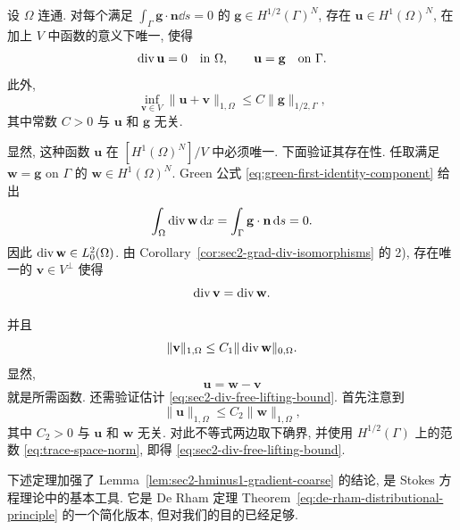 \setcounter{statement}{1}
\begin{Lemma}\label{lem:sec2-div-free-lifting}
设 $\Omega$ 连通. 对每个满足 $\int_\Gamma\mathbf g\cdot\mathbf n\dd s=0$ 的
$\mathbf g\in H^{1/2}(\Gamma)^N$, 存在 $\mathbf u\in H^1(\Omega)^N$, 在加上
$V$ 中函数的意义下唯一, 使得
\[
  \operatorname{div}\mathbf u=0\quad\text{in }\Omega,
  \qquad \mathbf u=\mathbf g\quad\text{on }\Gamma.
\]
此外,
\begin{equation}\label{eq:sec2-div-free-lifting-bound}
  \inf_{\mathbf v\in V}\|\mathbf u+\mathbf v\|_{1,\Omega}
  \le C\|\mathbf g\|_{1/2,\Gamma},
\end{equation}
其中常数 $C>0$ 与 $\mathbf u$ 和 $\mathbf g$ 无关.
\end{Lemma}
\begin{Proof}
显然, 这种函数 $\mathbf u$ 在 $[H^1(\Omega)^N]/V$ 中必须唯一. 下面验证其存在性.
任取满足 $\mathbf w=\mathbf g$ on $\Gamma$ 的 $\mathbf w\in H^1(\Omega)^N$.
Green 公式 \eqref{eq:green-first-identity-component} 给出
\[
  \int_\Omega\operatorname{div}\mathbf w\,\mathrm{d} x
  =\int_\Gamma\mathbf g\cdot\mathbf n\,\mathrm{d} s=0.
\]
因此 $\operatorname{div}\mathbf w\in L_0^2(\Omega)$. 由 Corollary~\ref{cor:sec2-grad-div-isomorphisms} 的 2),
存在唯一的 $\mathbf v\in V^\perp$ 使得
\[
  \operatorname{div}\mathbf v=\operatorname{div}\mathbf w.
\]

并且
\[
  \|\mathbf v\|_{1,\Omega}\le C_1\|\operatorname{div}\mathbf w\|_{0,\Omega}.
\]
显然,
\[
  \mathbf u=\mathbf w-\mathbf v
\]
就是所需函数. 还需验证估计 \eqref{eq:sec2-div-free-lifting-bound}. 首先注意到
\[
  \|\mathbf u\|_{1,\Omega}\le C_2\|\mathbf w\|_{1,\Omega},
\]
其中 $C_2>0$ 与 $\mathbf u$ 和 $\mathbf w$ 无关. 对此不等式两边取下确界, 并使用
$H^{1/2}(\Gamma)$ 上的范数 \eqref{eq:trace-space-norm}, 即得
\eqref{eq:sec2-div-free-lifting-bound}.
\end{Proof}

下述定理加强了 Lemma~\ref{lem:sec2-hminus1-gradient-coarse} 的结论,
是 Stokes 方程理论中的基本工具. 它是 De Rham 定理
Theorem~\eqref{eq:de-rham-distributional-principle} 的一个简化版本, 但对我们的目的已经足够.

